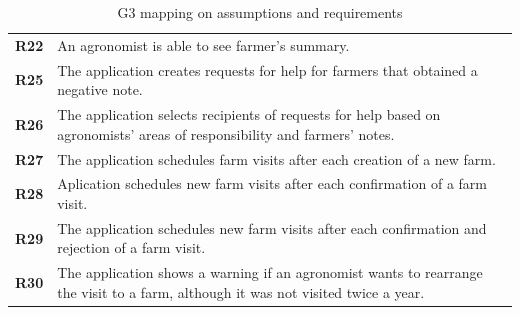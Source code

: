 \begin{table}[H]
\begin{tabularx}{\linewidth}{lX}
         \textbf{R22} & An agronomist is able to see farmer's summary. \\
          \textbf{R25} & The application creates requests for help for farmers that obtained a negative note. \\
          \textbf{R26} &  The application selects recipients of requests for help based on agronomists' areas of responsibility and farmers' notes. \\
          \textbf{R27} &  The application schedules farm visits after each creation of a new farm. \\
          \textbf{R28} &  Aplication schedules new farm visits after each confirmation of a farm visit. \\
          \textbf{R29} &  The application schedules new farm visits after each confirmation and rejection of a farm visit. \\
          \textbf{R30} &  The application shows a warning if an agronomist wants to rearrange the visit to a farm, although it was not visited twice a year. \\
         \bottomrule
    \end{tabularx}
    \caption{G3 mapping on assumptions and requirements}
\end{table}

